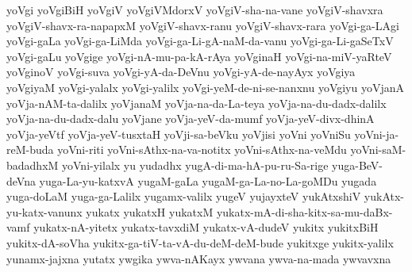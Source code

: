 {yoVgi
yoVgiBiH
yoVgiV
yoVgiVMdorxV
yoVgiV-sha-na-vane
yoVgiV-shavxra
yoVgiV-shavx-ra-napapxM
yoVgiV-shavx-ranu
yoVgiV-shavx-rara
yoVgi-ga-LAgi
yoVgi-gaLa
yoVgi-ga-LiMda
yoVgi-ga-Li-gA-naM-da-vanu
yoVgi-ga-Li-gaSeTxV
yoVgi-gaLu
yoVgige
yoVgi-nA-mu-pa-kA-rAya
yoVginaH
yoVgi-na-miV-yaRteV
yoVginoV
yoVgi-suva
yoVgi-yA-da-DeVnu
yoVgi-yA-de-nayAyx
yoVgiya
yoVgiyaM
yoVgi-yalalx
yoVgi-yalilx
yoVgi-yeM-de-ni-se-nanxnu
yoVgiyu
yoVjanA
yoVja-nAM-ta-dalilx
yoVjanaM
yoVja-na-da-La-teya
yoVja-na-du-dadx-dalilx
yoVja-na-du-dadx-dalu
yoVjane
yoVja-yeV-da-mumf
yoVja-yeV-divx-dhinA
yoVja-yeVtf
yoVja-yeV-tusxtaH
yoVji-sa-beVku
yoVjisi
yoVni
yoVniSu
yoVni-ja-reM-buda
yoVni-riti
yoVni-sAthx-na-va-notitx
yoVni-sAthx-na-veMdu
yoVni-saM-badadhxM
yoVni-yilalx
yu
yudadhx
yugA-di-ma-hA-pu-ru-Sa-rige
yuga-BeV-deVna
yuga-La-yu-katxvA
yugaM-gaLa
yugaM-ga-La-no-La-goMDu
yugada
yuga-doLaM
yuga-ga-Lalilx
yugamx-valilx
yugeV
yujayxteV
yukAtxshiV
yukAtx-yu-katx-vanunx
yukatx
yukatxH
yukatxM
yukatx-mA-di-sha-kitx-sa-mu-daBx-vamf
yukatx-nA-yitetx
yukatx-tavxdiM
yukatx-vA-dudeV
yukitx
yukitxBiH
yukitx-dA-soVha
yukitx-ga-tiV-ta-vA-du-deM-deM-bude
yukitxge
yukitx-yalilx
yunamx-jajxna
yutatx
ywgika
ywva-nAKayx
ywvana
ywva-na-mada
ywvavxna
}
